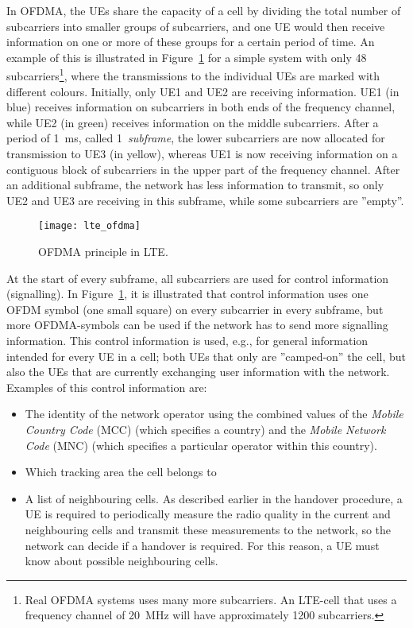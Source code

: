 In OFDMA, the UEs share the capacity of a cell by dividing the total number of subcarriers into smaller groups of subcarriers, and one UE would then receive information on one or more of these groups for a certain period of time. An example of this is illustrated in Figure~\ref{fig:lte_ofdma} for a simple system with only 48 subcarriers\footnote{Real OFDMA systems uses many more subcarriers. An LTE-cell that uses a frequency channel of 20~MHz will have approximately 1200 subcarriers.}, where the transmissions to the individual UEs are marked with different colours. Initially, only UE1 and UE2 are receiving information. UE1 (in blue) receives information on subcarriers in both ends of the frequency channel, while UE2 (in green) receives information on the middle subcarriers. After a period of 1~ms, called 1~\emph{subframe}, the lower subcarriers are now allocated for transmission to UE3 (in yellow), whereas UE1 is now receiving information on a contiguous block of subcarriers in the upper part of the frequency channel. After an additional subframe, the network has less information to transmit, so only UE2 and UE3 are receiving in this subframe, while some subcarriers are ''empty''.

\begin{figure}[htbp]
\centering
\texttt{[image: lte\_ofdma]}
\caption{\label{fig:lte_ofdma}OFDMA principle in LTE.}
\end{figure}

At the start of every subframe, all subcarriers are used for control information (signalling). In Figure~\ref{fig:lte_ofdma}, it is illustrated that control information uses one OFDM symbol (one small square) on every subcarrier in every subframe, but more OFDMA-symbols can be used if the network has to send more signalling information. This control information is used, e.g., for general information intended for every UE in a cell; both UEs that only are ''camped-on'' the cell, but also the UEs that are currently exchanging user information with the network. Examples of this control information are:
\begin{itemize}
\item The identity of the network operator using the combined values of the \emph{Mobile Country Code} (MCC) (which specifies a country) and the \emph{Mobile Network Code} (MNC) (which specifies a particular operator within this country).
%
\item Which tracking area the cell belongs to
%
\item A list of neighbouring cells. As described earlier in the handover procedure, a UE is required to periodically measure the radio quality in the current and neighbouring cells and transmit these measurements to the network, so the network can decide if a handover is required. For this reason, a UE must know about possible neighbouring cells.
%
\end{itemize}

